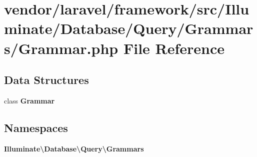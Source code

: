 \section{vendor/laravel/framework/src/\+Illuminate/\+Database/\+Query/\+Grammars/\+Grammar.php File Reference}
\label{laravel_2framework_2src_2_illuminate_2_database_2_query_2_grammars_2_grammar_8php}
\subsection*{Data Structures}
\begin{DoxyCompactItemize}
\item 
class {\bf Grammar}
\end{DoxyCompactItemize}
\subsection*{Namespaces}
\begin{DoxyCompactItemize}
\item 
 {\bf Illuminate\textbackslash{}\+Database\textbackslash{}\+Query\textbackslash{}\+Grammars}
\end{DoxyCompactItemize}
